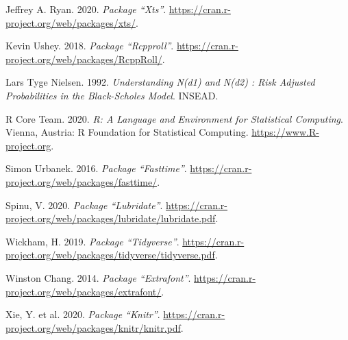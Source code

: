 \documentclass[
  12pt,
]{article}
\begin{document}
\leavevmode\hypertarget{ref-xts}{}%
Jeffrey A. Ryan. 2020. \emph{Package ``Xts''}.
\url{https://cran.r-project.org/web/packages/xts/}.

\leavevmode\hypertarget{ref-RcppRoll}{}%
Kevin Ushey. 2018. \emph{Package ``Rcpproll''}.
\url{https://cran.r-project.org/web/packages/RcppRoll/}.

\leavevmode\hypertarget{ref-Nielsen}{}%
Lars Tyge Nielsen. 1992. \emph{Understanding N(d1) and N(d2) : Risk
Adjusted Probabilities in the Black-Scholes Model}. INSEAD.

\leavevmode\hypertarget{ref-R-base}{}%
R Core Team. 2020. \emph{R: A Language and Environment for Statistical
Computing}. Vienna, Austria: R Foundation for Statistical Computing.
\url{https://www.R-project.org}.

\leavevmode\hypertarget{ref-fasttime}{}%
Simon Urbanek. 2016. \emph{Package ``Fasttime''}.
\url{https://cran.r-project.org/web/packages/fasttime/}.

\leavevmode\hypertarget{ref-lubridate}{}%
Spinu, V. 2020. \emph{Package ``Lubridate''}.
\url{https://cran.r-project.org/web/packages/lubridate/lubridate.pdf}.

\leavevmode\hypertarget{ref-tidyverse}{}%
Wickham, H. 2019. \emph{Package ``Tidyverse''}.
\url{https://cran.r-project.org/web/packages/tidyverse/tidyverse.pdf}.

\leavevmode\hypertarget{ref-extrafont}{}%
Winston Chang. 2014. \emph{Package ``Extrafont''}.
\url{https://cran.r-project.org/web/packages/extrafont/}.

\leavevmode\hypertarget{ref-knitr}{}%
Xie, Y. et al. 2020. \emph{Package ``Knitr''}.
\url{https://cran.r-project.org/web/packages/knitr/knitr.pdf}.
\end{document}
